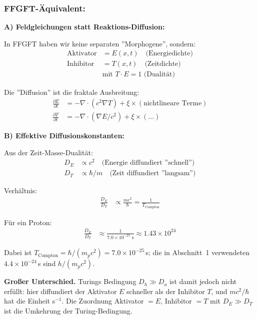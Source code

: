 \subsubsection*{FFGFT-Äquivalent:}

\textbf{A) Feldgleichungen statt Reaktions-Diffusion:}

In FFGFT haben wir keine separaten ''Morphogene'', sondern:
\begin{align*}
	\text{Aktivator} &= E(x,t) \quad \text{(Energiedichte)} \\
	\text{Inhibitor} &= T(x,t) \quad \text{(Zeitdichte)} \\
	&\text{mit } T \cdot E = 1 \text{ (Dualität)}
\end{align*}

Die ''Diffusion'' ist die fraktale Ausbreitung:
\begin{align*}
	\frac{\partial E}{\partial t} &= -\nabla \cdot (c^2 \nabla T) + \xi \times (\text{nichtlineare Terme}) \\
	\frac{\partial T}{\partial t} &= -\nabla \cdot (\nabla E/c^2) + \xi \times (\dots)
\end{align*}

\textbf{B) Effektive Diffusionskonstanten:}

Aus der Zeit-Masse-Dualität:
\begin{align*}
	D_E &\propto c^2 \quad \text{(Energie diffundiert ''schnell'')} \\
	D_T &\propto \hbar/m \quad \text{(Zeit diffundiert ''langsam'')}
\end{align*}

Verhältnis:
\begin{align*}
	\frac{D_E}{D_T} &\propto \frac{m c^2}{\hbar} = \frac{1}{T_{\text{Compton}}}
\end{align*}

Für ein Proton:
\begin{align*}
	\frac{D_E}{D_T} &\approx \frac{1}{7.0 \times 10^{-25} \text{ s}} \approx 1.43 \times 10^{24}
\end{align*}

Dabei ist $T_{\text{Compton}} = \hbar/(m_p c^2) = 7.0\times10^{-25}$\,s; die in Abschnitt~1 verwendeten $4.4\times10^{-24}$\,s sind $h/(m_p c^2)$.

\textbf{Großer Unterschied.} Turings Bedingung $D_h \gg D_a$ ist damit jedoch nicht erfüllt: hier diffundiert der Aktivator $E$ schneller als der Inhibitor $T$, und $mc^2/\hbar$ hat die Einheit s$^{-1}$. Die Zuordnung Aktivator $=E$, Inhibitor $=T$ mit $D_E \gg D_T$ ist die Umkehrung der Turing-Bedingung.

